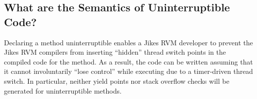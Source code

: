 \subsection{What are the Semantics of Uninterruptible Code?}
Declaring a method uninterruptible enables a Jikes RVM developer to
prevent the Jikes RVM compilers from inserting ``hidden'' thread
switch points in the compiled code for the method.  As a result, the
code can be written assuming that it cannot involuntarily ``lose
control'' while executing due to a timer-driven thread switch. In
particular, neither yield points nor stack overflow
checks will be generated for uninterruptible methods. 

